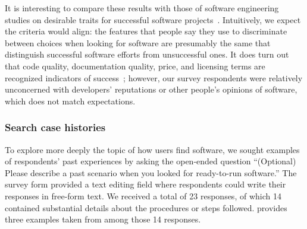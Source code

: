 \documentclass{casicswhitepaper}
\begin{document}
It is interesting to compare these results with those of software engineering studies on desirable traits for successful software projects~\cite[e.g.,][]{subramaniam2009determinants, crowston2003defining, sen2012open}. Intuitively, we expect the criteria would align: the features that people say they use to discriminate between choices when looking for software are presumably the same that distinguish successful software efforts from unsuccessful ones.  It does turn out that code quality, documentation quality, price, and licensing terms are recognized indicators of success~\cite{subramaniam2009determinants, crowston2003defining}; however, our survey respondents were relatively unconcerned with developers' reputations or other people's opinions of software, which does not match expectations.


\subsubsection{Search case histories}

To explore more deeply the topic of how users find software, we sought examples of respondents' past experiences by asking the open-ended question ``(Optional) Please describe a past scenario when you looked for ready-to-run software.''  The survey form provided a text editing field where respondents could write their responses in free-form text.  We received a total of 23 responses, of which 14 contained substantial details about the procedures or steps followed.   provides three examples taken from among those 14 responses.
\end{document}
